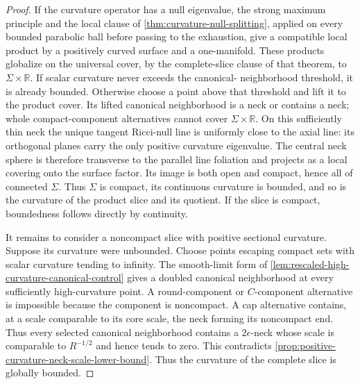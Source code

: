 \begin{proof}
If the curvature operator has a null eigenvalue, the strong maximum principle
and the local clause of \ref{thm:curvature-null-splitting}, applied on every
bounded parabolic ball before passing to the exhaustion, give a compatible
local product by a positively curved surface and a one-manifold.  These
products globalize on the universal cover, by the complete-slice clause of
that theorem, to $\Sigma\times\mathbb R$.  If scalar curvature never exceeds the canonical-
neighborhood threshold, it is already bounded.  Otherwise choose a point
above that threshold and lift it to the product cover.  Its lifted canonical
neighborhood is a neck or contains a
neck; whole compact-component alternatives cannot cover
$\Sigma\times\mathbb R$.  On this sufficiently thin neck the unique tangent
Ricci-null line is uniformly close to the axial line: its orthogonal planes
carry the only positive curvature eigenvalue.  The central neck sphere is
therefore transverse to the parallel line foliation and projects as a local
covering onto the surface factor.  Its image is both open and compact, hence
all of connected $\Sigma$.  Thus $\Sigma$ is compact, its continuous
curvature is bounded, and so is the curvature of the product slice and its
quotient.
If the slice is compact, boundedness follows directly by continuity.

It remains to consider a noncompact slice with positive sectional curvature.
Suppose its curvature were unbounded.  Choose points escaping compact sets
with scalar curvature tending to infinity.  The smooth-limit form of
\ref{lem:rescaled-high-curvature-canonical-control} gives a doubled canonical
neighborhood at every sufficiently high-curvature point.  A round-component
or $C$-component alternative is impossible because the component is
noncompact.  A cap alternative contains, at a scale comparable to its core
scale, the neck forming its noncompact end.  Thus every selected canonical
neighborhood contains a $2\epsilon$-neck whose scale is comparable to
$R^{-1/2}$ and hence tends to zero.  This contradicts
\ref{prop:positive-curvature-neck-scale-lower-bound}.  Thus the curvature of
the complete slice is globally bounded.
\end{proof}

